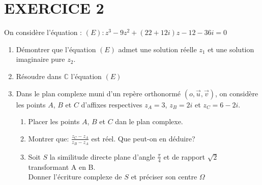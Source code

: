 \documentclass[13pts]{report}
\begin{document}
	\section*{EXERCICE 2}
		On considère l'équation : $(E): z^3-9z^2+(22+12i)z-12-36i=0$
		\begin{enumerate}
			\item Démontrer que l'équation $(E)$ admet une solution réelle $z_1$ et une solution imaginaire pure $z_2$.
			\item Résoudre dans $\mathbb{C}$ l'équation $(E)$
			\item Dans le plan complexe muni d'un repère orthonormé $(o,\overrightarrow{u},\overrightarrow{v})$, on considère les points $A$, $B$ et $C$ d'affixes respectives $z_A=3$, $z_B=2i$ et $z_C=6-2i$.
			\begin{enumerate}
				\item Placer les points $A$, $B$ et $C$ dan le plan complexe.
				\item Montrer que: $\frac{z_C-z_A}{z_B-z_A}$ est réel. Que peut-on en déduire?
				\item Soit $S$ la similitude directe plane d'angle $\frac{\pi}{4}$ et de rapport $\sqrt{2}$ transformant A en B.\\
				Donner l'écriture complexe de $S$ et préciser son centre $\Omega$
			\end{enumerate}
		\end{enumerate}
	
\end{document}
